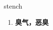 
\begin{frame}
{\huge stench}
\begin{center}
\begin{enumerate}\Large
  \item \textbf{臭气，恶臭}
\end{enumerate}
\end{center}
\end{frame}
